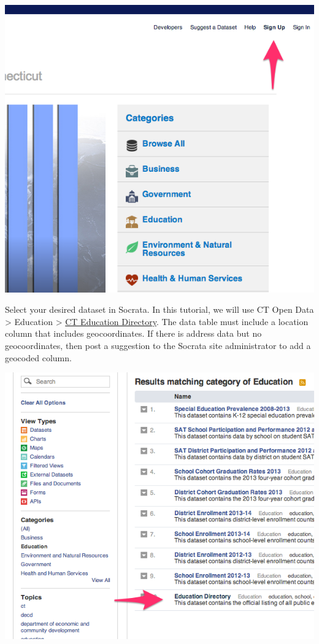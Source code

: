 \documentclass[
  english,
]{book}
\begin{document}
\includegraphics{images/06-map/SocrataMap1.png}

Select your desired dataset in Socrata. In this tutorial, we will use CT Open Data \textgreater{} Education \textgreater{} \href{https://data.ct.gov/Education/Education-Directory/9k2y-kqxn}{CT Education Directory}. The data table must include a location column that includes geocoordinates. If there is address data but no geocoordinates, then post a suggestion to the Socrata site administrator to add a geocoded column.

\includegraphics{images/06-map/SocrataMap2.png}
\end{document}
